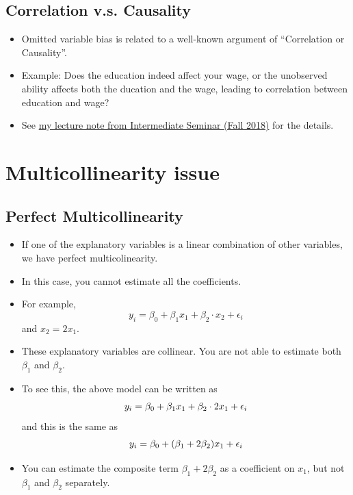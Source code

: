 \documentclass[]{book}
\providecommand{\tightlist}{%
  \setlength{\itemsep}{0pt}\setlength{\parskip}{0pt}}
\begin{document}
\subsection{Correlation v.s.
Causality}\label{correlation-v.s.-causality}

\begin{itemize}
\tightlist
\item
  Omitted variable bias is related to a well-known argument of
  ``Correlation or Causality''.
\item
  Example: Does the education indeed affect your wage, or the unobserved
  ability affects both the ducation and the wage, leading to correlation
  between education and wage?
\item
  See \href{Note_IntermediateSeminar_2018_Lecture1_Intro.pdf}{my lecture
  note from Intermediate Seminar (Fall 2018)} for the details.
\end{itemize}

\section{Multicollinearity issue}\label{multicollinearity-issue}

\subsection{Perfect Multicollinearity}\label{perfect-multicollinearity}

\begin{itemize}
\tightlist
\item
  If one of the explanatory variables is a linear combination of other
  variables, we have perfect multicolinearity.
\item
  In this case, you cannot estimate all the coefficients.
\item
  For example, \[
  y_i = \beta_0 + \beta_1 x_1 + \beta_2\cdot x_2 + \epsilon_i
  \] and \(x_2 = 2x_1\).
\item
  These explanatory variables are collinear. You are not able to
  estimate both \(\beta_1\) and \(\beta_2\).
\item
  To see this, the above model can be written as \[
  y_i = \beta_0 + \beta_1 x_1 + \beta_2\cdot2x_1 + \epsilon_i \\
  \] and this is the same as \[
  y_i =  \beta_0 + (\beta_1 + 2 \beta_2 ) x_1 + \epsilon_i \\
  \]
\item
  You can estimate the composite term \(\beta_1 + 2 \beta_2\) as a
  coefficient on \(x_1\), but not \(\beta_1\) and \(\beta_2\)
  separately.
\end{itemize}
\end{document}
